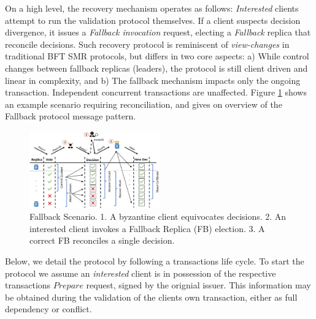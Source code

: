 On a high level, the recovery mechanism operates as follows: \textit{Interested} clients attempt to run the validation protocol themselves. If a client suspects decision divergence, it issues a \textit{Fallback invocation} request, electing a \textit{Fallback} replica that reconcile decisions. Such recovery protocol is reminiscent of \textit{view-changes} in traditional BFT SMR protocols, but differs in two core aspects: a) While control changes between fallback replicas (leaders), the protocol is still client driven and linear in complexity, and b) The fallback mechanism impacts only the ongoing transaction. Independent concurrent transactions are unaffected. Figure \ref{fig:FigureFBnom} shows an example scenario requiring reconciliation, and gives on overview of the  Fallback protocol message pattern.

\begin{figure}
\begin{center}
\includegraphics[width= 0.5\textwidth]{./figures/FBNom.png}
\end{center}
\caption{Fallback Scenario. 1. A byzantine client equivocates decisions. 2. An interested client invokes a Fallback Replica (FB) election. 3. A correct FB reconciles a single decision.}
\label{fig:FigureFBnom}
\end{figure}


Below, we detail the protocol by following a transactions life cycle. To start the protocol we assume an \textit{interested} client is in possession of the respective transactions $Prepare$ request, signed by the orignial issuer. This information may be obtained during the validation of the clients own transaction, either as full dependency or conflict. 



